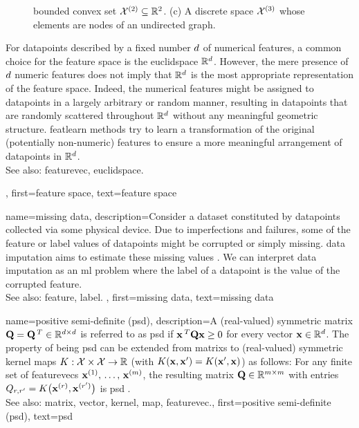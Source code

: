{{\begin{figure}[H]
{		bounded \gls{convex} set $\mathcal{X}^{(2)} \subseteq \mathbb{R}^{2}$. (c) A discrete space 
		$\mathcal{X}^{(3)}$ whose elements are nodes of an undirected \gls{graph}.}
		\end{figure}
		For \glspl{datapoint} described by a fixed number $d$ of numerical \glspl{feature}, 
		a common choice for the \gls{feature} space is the \gls{euclidspace} $\mathbb{R}^{d}$. 
		However, the mere presence of $d$ numeric \glspl{feature} does not imply that $\mathbb{R}^{d}$ 
		is the most appropriate representation of the \gls{feature} space. Indeed, the numerical \glspl{feature}  
		might be assigned to \glspl{datapoint} in a largely arbitrary or random manner, resulting 
		in \glspl{datapoint} that are randomly scattered throughout $\mathbb{R}^{d}$ 
		without any meaningful geometric structure. \Gls{featlearn} methods try to learn a 
		transformation of the original (potentially non-numeric) \glspl{feature} to ensure a 
		more meaningful arrangement of \glspl{datapoint} in $\mathbb{R}^{d}$. 
				\\
		See also: \gls{featurevec}, \gls{euclidspace}.},
	first={feature space},
	text={feature space}  
}


{name={missing data},
	description={Consider a \gls{dataset} constituted by \glspl{datapoint} collected via 
		some physical \gls{device}. Due to imperfections and failures, some of the \gls{feature} 
		or \gls{label} values of \glspl{datapoint} might be corrupted or simply missing. 
		\Gls{data} imputation aims to estimate these missing values \cite{Abayomi2008DiagnosticsFM}. 
		We can interpret \gls{data} imputation as an \gls{ml} problem where the \gls{label} of a \gls{datapoint} is 
		the value of the corrupted \gls{feature}.
				\\
		See also: \gls{feature}, \gls{label}. },
	first={missing data},
	text={missing data}  
}


{name={positive semi-definite (psd)},
	description={A (real-valued) symmetric \gls{matrix} $\mathbf{Q} = \mathbf{Q}\,^{T} \in \mathbb{R}^{d \times d}$ 
	 	is referred to as psd if ${\bf x}\,^{T} \mathbf{Q} {\bf x} \geq 0$ for every \gls{vector} ${\bf x} \in \mathbb{R}^{d}$. 
	 	The property of being psd can be extended from \glspl{matrix} to (real-valued) 
	 	symmetric \gls{kernel} \glspl{map} $K: \mathcal{X} \times \mathcal{X} \rightarrow \mathbb{R}$ 
	 	(with $K({\bf x},{\bf x}') = K({\bf x}',{\bf x})$)
	 	as follows: For any finite set of \glspl{featurevec} ${\bf x}^{(1)}, \,\ldots, \,{\bf x}^{(m)}$, 
	 	the resulting \gls{matrix} $\mathbf{Q} \in \mathbb{R}^{m \times m}$ with 
		entries $Q_{r,r'} = K\big({\bf x}^{(r)},{\bf x}^{(r')}\big)$ 
		is psd \cite{LearningKernelsBook}.
			\\
		See also: \gls{matrix}, \gls{vector}, \gls{kernel}, \gls{map}, \gls{featurevec}.},
	first={positive semi-definite (psd)},
	text={psd}  
}


